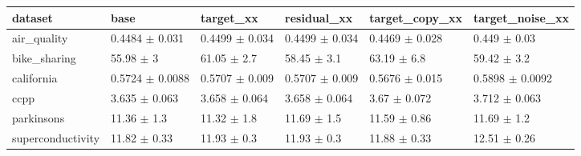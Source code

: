 \begin{tabular}{llllll}
\toprule
dataset & base & target\_xx & residual\_xx & target\_copy\_xx & target\_noise\_xx \\
\midrule
air\_quality & 0.4484 $\pm$ 0.031 & 0.4499 $\pm$ 0.034 & 0.4499 $\pm$ 0.034 & 0.4469 $\pm$ 0.028 & 0.449 $\pm$ 0.03 \\
bike\_sharing & 55.98 $\pm$ 3 & 61.05 $\pm$ 2.7 & 58.45 $\pm$ 3.1 & 63.19 $\pm$ 6.8 & 59.42 $\pm$ 3.2 \\
california & 0.5724 $\pm$ 0.0088 & 0.5707 $\pm$ 0.009 & 0.5707 $\pm$ 0.009 & 0.5676 $\pm$ 0.015 & 0.5898 $\pm$ 0.0092 \\
ccpp & 3.635 $\pm$ 0.063 & 3.658 $\pm$ 0.064 & 3.658 $\pm$ 0.064 & 3.67 $\pm$ 0.072 & 3.712 $\pm$ 0.063 \\
parkinsons & 11.36 $\pm$ 1.3 & 11.32 $\pm$ 1.8 & 11.69 $\pm$ 1.5 & 11.59 $\pm$ 0.86 & 11.69 $\pm$ 1.2 \\
superconductivity & 11.82 $\pm$ 0.33 & 11.93 $\pm$ 0.3 & 11.93 $\pm$ 0.3 & 11.88 $\pm$ 0.33 & 12.51 $\pm$ 0.26 \\
\bottomrule
\end{tabular}
